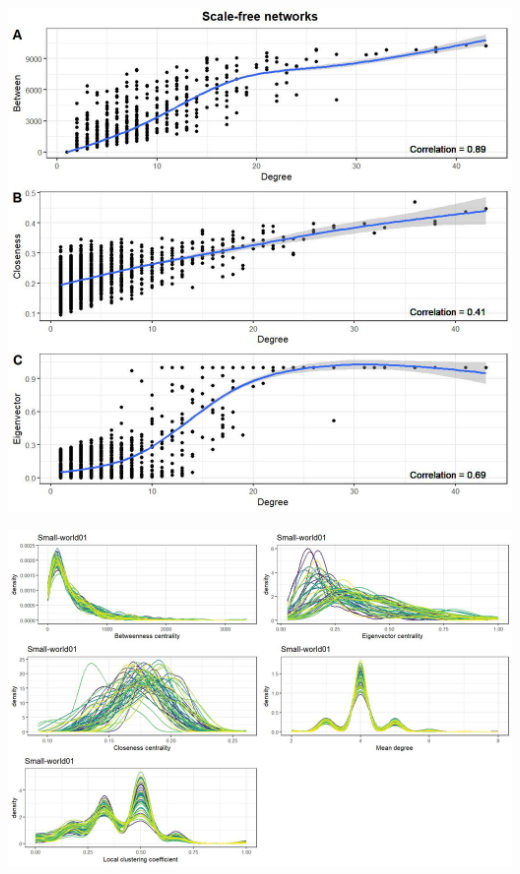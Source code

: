 \documentclass[
]{article}
\begin{document}
\begin{center}\includegraphics{./Figures/unnamed-chunk-192-1} \end{center}

\begin{center}\includegraphics{./Figures/unnamed-chunk-192-2} \end{center}
\end{document}
